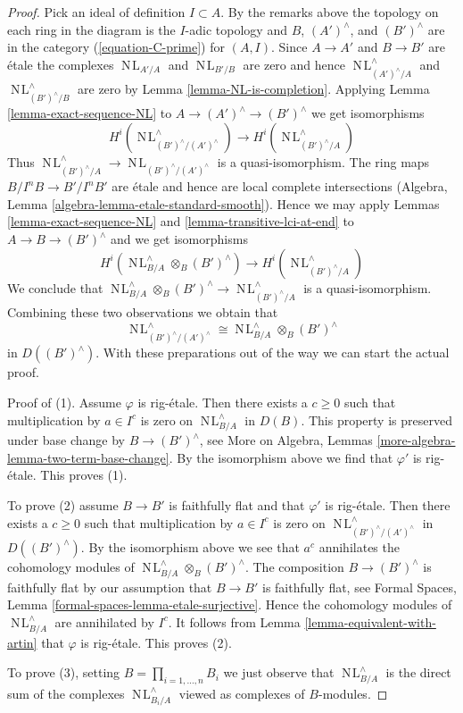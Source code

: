 \documentclass{stacks-project}
\theoremstyle{plain}
\theoremstyle{definition}
\theoremstyle{remark}
\numberwithin{equation}{subsection}
\def\NL{\mathop{N\!L}\nolimits}
\begin{document}
\begin{proof}
\medskip\noindent
Pick an ideal of definition $I \subset A$. By the remarks above
the topology on each ring in the diagram is the $I$-adic topology
and $B$, $(A')^\wedge$, and $(B')^\wedge$ are in the category
(\ref{equation-C-prime}) for $(A, I)$.
Since $A \to A'$ and $B \to B'$ are \'etale the complexes
$\NL_{A'/A}$ and $\NL_{B'/B}$ are zero and hence
$\NL_{(A')^\wedge/A}^\wedge$ and $\NL_{(B')^\wedge/B}^\wedge$
are zero by Lemma \ref{lemma-NL-is-completion}.
Applying Lemma \ref{lemma-exact-sequence-NL} to
$A \to (A')^\wedge \to (B')^\wedge$ we get isomorphisms
$$
H^i(\NL_{(B')^\wedge/(A')^\wedge}^\wedge) \to H^i(\NL_{(B')^\wedge/A}^\wedge)
$$
Thus $\NL_{(B')^\wedge/A}^\wedge \to \NL_{(B')^\wedge/(A')^\wedge}$
is a quasi-isomorphism. The ring maps $B/I^nB \to B'/I^nB'$ are \'etale
and hence are local complete intersections
(Algebra, Lemma \ref{algebra-lemma-etale-standard-smooth}).
Hence we may apply
Lemmas \ref{lemma-exact-sequence-NL} and
\ref{lemma-transitive-lci-at-end} to
$A \to B \to (B')^\wedge$ and we get isomorphisms
$$
H^i(\NL_{B/A}^\wedge \otimes_B (B')^\wedge) \to
H^i(\NL_{(B')^\wedge/A}^\wedge)
$$
We conclude that
$\NL_{B/A}^\wedge \otimes_B (B')^\wedge \to \NL_{(B')^\wedge/A}^\wedge$
is a quasi-isomorphism. Combining these two observations we obtain that
$$
\NL_{(B')^\wedge/(A')^\wedge}^\wedge \cong
\NL_{B/A}^\wedge \otimes_B (B')^\wedge
$$
in $D((B')^\wedge)$.
With these preparations out of the way we can start the actual proof.

\medskip\noindent
Proof of (1). Assume $\varphi$ is rig-\'etale. Then there exists a $c \geq 0$
such that multiplication by $a \in I^c$ is zero on $\NL_{B/A}^\wedge$
in $D(B)$. This property is preserved under base change
by $B \to (B')^\wedge$, see
More on Algebra, Lemmas \ref{more-algebra-lemma-two-term-base-change}.
By the isomorphism above we find that $\varphi'$ is rig-\'etale.
This proves (1).

\medskip\noindent
To prove (2) assume $B \to B'$ is faithfully flat and that $\varphi'$
is rig-\'etale. Then there exists a $c \geq 0$ such that
multiplication by $a \in I^c$ is zero on
$\NL_{(B')^\wedge/(A')^\wedge}^\wedge$ in $D((B')^\wedge)$.
By the isomorphism above we see that $a^c$ annihilates the
cohomology modules of
$\NL_{B/A}^\wedge \otimes_B (B')^\wedge$.
The composition $B \to (B')^\wedge$ is faithfully flat
by our assumption that $B \to B'$ is faithfully flat, see
Formal Spaces, Lemma \ref{formal-spaces-lemma-etale-surjective}.
Hence the cohomology modules of $\NL_{B/A}^\wedge$ are annihilated
by $I^c$. It follows from Lemma \ref{lemma-equivalent-with-artin}
that $\varphi$ is rig-\'etale.
This proves (2).

\medskip\noindent
To prove (3), setting $B = \prod_{i = 1, \ldots, n} B_i$
we just observe that $\NL_{B/A}^\wedge$ is the direct
sum of the complexes $\NL_{B_i/A}^\wedge$ viewed as complexes
of $B$-modules.
\end{proof}
\end{document}
